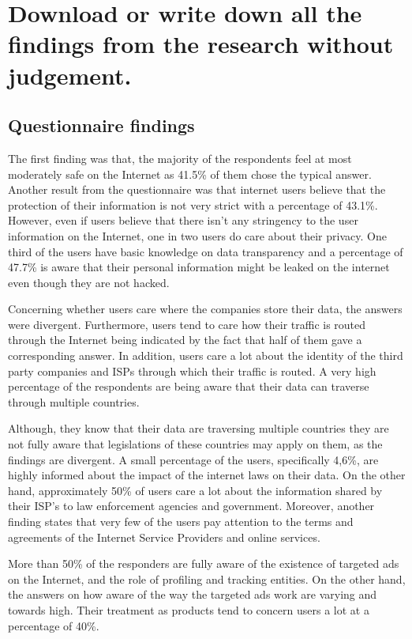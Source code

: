\section{Download or write down all the findings from the research without 
judgement.}
\label{section_1}

\subsection{Questionnaire findings}

The first finding was that, the majority  of the respondents feel at most 
moderately safe on the Internet as 41.5\% of them chose the typical answer. 
Another result from the questionnaire was that internet users believe that the 
protection of their information is not very strict with a percentage of 43.1\%. 
However, even if users believe that there isn't any stringency to the user 
information on the Internet, one in two users do care about their privacy. 
One third of the users have basic knowledge on data transparency and a 
percentage of 47.7\% is aware that their personal information might be leaked on 
the internet even though they are not hacked. 

Concerning whether users care where the companies store their data, the answers 
were divergent. Furthermore, users  tend to care how their traffic is routed 
through the Internet being indicated by the fact that half of them gave a 
corresponding answer. In addition, users care a lot about the identity of the 
third party companies and ISPs through which their traffic is routed. 
A very high percentage of the respondents are being aware that their data can 
traverse through multiple countries. 

Although, they know that their data are traversing multiple countries they are 
not fully aware that legislations of these countries may apply on them, as the 
findings are divergent. A small percentage of the users, specifically 4,6\%, are 
highly informed about the impact of the internet laws on their data. 
On the other hand, approximately 50\% of users care a lot about  the information 
shared by their ISP's to law enforcement agencies and government. Moreover, 
another finding states that very few of the users pay attention to the terms and 
agreements of the Internet Service Providers and online services.

More than 50\% of the responders are fully aware of the existence of targeted 
ads on the Internet, and the role of profiling and tracking entities. On the 
other hand, the answers on how aware of the way the targeted ads work are 
varying and towards high. Their treatment as products tend to concern users a 
lot at a percentage of 40\%. 

